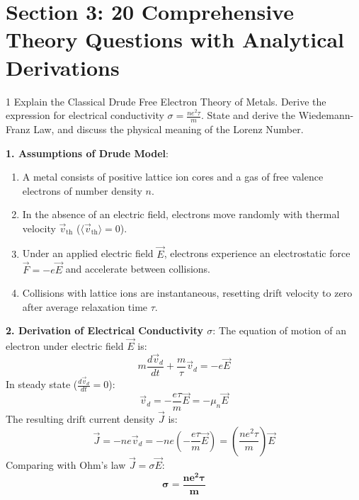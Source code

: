 \newpage
\section{Section 3: 20 Comprehensive Theory Questions with Analytical Derivations}

\begin{theoryq}{1}
Explain the Classical Drude Free Electron Theory of Metals. Derive the expression for electrical conductivity $\sigma = \frac{n e^2 \tau}{m}$. State and derive the Wiedemann-Franz Law, and discuss the physical meaning of the Lorenz Number.
\end{theoryq}
\begin{theorysol}
\textbf{1. Assumptions of Drude Model}:
\begin{enumerate}
    \item A metal consists of positive lattice ion cores and a gas of free valence electrons of number density $n$.
    \item In the absence of an electric field, electrons move randomly with thermal velocity $\vec{v}_{\text{th}}$ ($\langle \vec{v}_{\text{th}} \rangle = 0$).
    \item Under an applied electric field $\vec{E}$, electrons experience an electrostatic force $\vec{F} = -e\vec{E}$ and accelerate between collisions.
    \item Collisions with lattice ions are instantaneous, resetting drift velocity to zero after average relaxation time $\tau$.
\end{enumerate}

\textbf{2. Derivation of Electrical Conductivity $\sigma$}:
The equation of motion of an electron under electric field $\vec{E}$ is:
\begin{equation}
m \frac{d\vec{v}_d}{dt} + \frac{m}{\tau}\vec{v}_d = -e\vec{E}
\end{equation}
In steady state ($\frac{d\vec{v}_d}{dt} = 0$):
\begin{equation}
\vec{v}_d = -\frac{e\tau}{m}\vec{E} = -\mu_n \vec{E}
\end{equation}
The resulting drift current density $\vec{J}$ is:
\begin{equation}
\vec{J} = -n e \vec{v}_d = -n e \left( -\frac{e\tau}{m}\vec{E} \right) = \left( \frac{n e^2 \tau}{m} \right)\vec{E}
\end{equation}
Comparing with Ohm's law $\vec{J} = \sigma \vec{E}$:
\begin{equation}
\mathbf{\sigma = \frac{n e^2 \tau}{m}}
\end{equation}


\end{theorysol}
